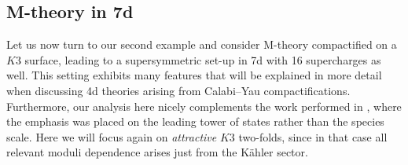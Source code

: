 	
	
	
	
	
\subsection{M-theory in 7d}\label{ss:Mthy7dpattern}
	
Let us now turn to our second example and consider M-theory compactified on a $K3$ surface, leading to a supersymmetric set-up in 7d with 16 supercharges as well. This setting exhibits many features that will be explained in more detail when discussing 4d theories arising from Calabi--Yau compactifications. Furthermore, our analysis here nicely complements the work performed in \cite{Lee:2019xtm}, where the emphasis was placed on the leading tower of states rather than the species scale. Here we will focus again on \emph{attractive} $K3$ two-folds, since in that case all relevant moduli dependence arises just from the K\"ahler sector.

